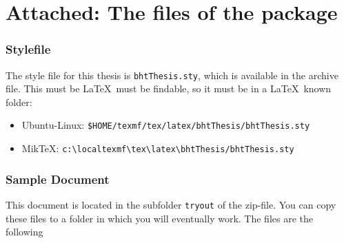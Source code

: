 

\chapter{Attached: The files of the package}


\subsection*{Stylefile}
The style file for this thesis is  \texttt{bhtThesis.sty}, which is available in the
archive file.  This must be \LaTeX\  must be findable, so it must be in a
\LaTeX\ known folder:
\begin{itemize}
\item Ubuntu-Linux: \verb|$HOME/texmf/tex/latex/bhtThesis/bhtThesis.sty|
\item MikTeX: \verb|c:\localtexmf\tex\latex\bhtThesis/bhtThesis.sty|
\end{itemize}

\subsection*{Sample Document}
This document is located in the subfolder  \texttt{tryout} of the zip-file. You can copy these files to a folder in which you will eventually work. The files are the following


